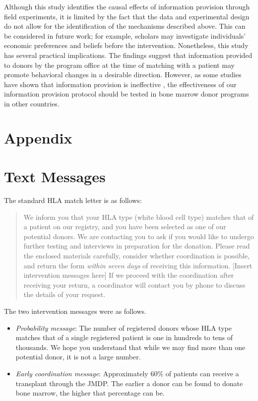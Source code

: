 \documentclass [12pt, a4paper]{article}
\providecommand{\tightlist}{%
  \setlength{\itemsep}{0pt}\setlength{\parskip}{0pt}}
\begin{document}
Although this study identifies the causal effects of information provision through field experiments, it is limited by the fact that the data and experimental design do not allow for the identification of the mechanisms described above. This can be considered in future work; for example, scholars may investigate individuals' economic preferences and beliefs before the intervention. Nonetheless, this study has several practical implications. The findings suggest that information provided to donors by the program office at the time of matching with a patient may promote behavioral changes in a desirable direction. However, as some studies have shown that information provision is ineffective \citep[for example,][]{Switzer2018}, the effectiveness of our information provision protocol should be tested in bone marrow donor programs in other countries.

\clearpage

\appendix

\hypertarget{appendix}{%
\section*{Appendix}\label{appendix}}

\hypertarget{message}{%
\section{Text Messages}\label{message}}

The standard HLA match letter is as follows:

\begin{quote}
We inform you that your HLA type (white blood cell type) matches that of a patient on our registry, and you have been selected as one of our potential donors. We are contacting you to ask if you would like to undergo further testing and interviews in preparation for the donation. Please read the enclosed materials carefully, consider whether coordination is possible, and return the form \emph{within seven days} of receiving this information. {[}Insert intervention messages here{]} If we proceed with the coordination after receiving your return, a coordinator will contact you by phone to discuss the details of your request.
\end{quote}

The two intervention messages were as follows.

\begin{itemize}
\tightlist
\item
  \emph{Probability message}: The number of registered donors whose HLA type matches that of a single registered patient is one in hundreds to tens of thousands. We hope you understand that while we may find more than one potential donor, it is not a large number.
\item
  \emph{Early coordination message}: Approximately 60\% of patients can receive a transplant through the JMDP. The earlier a donor can be found to donate bone marrow, the higher that percentage can be.
\end{itemize}
\end{document}
